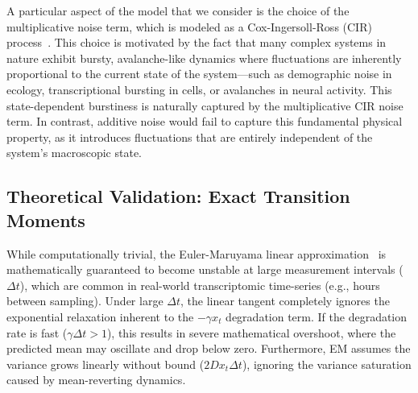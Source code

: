 \documentclass[10pt, aps, rmp,  twocolumn, superscriptaddress, floatfix, showkeys]{revtex4-2}
\begin{document}

A particular aspect of the model that we consider is the choice of the multiplicative noise term, which is modeled as a Cox-Ingersoll-Ross (CIR) process~\cite{cox1985theory}. This choice is motivated by the fact that many complex systems in nature exhibit bursty, avalanche-like dynamics where fluctuations are inherently proportional to the current state of the system---such as demographic noise in ecology, transcriptional bursting in cells, or avalanches in neural activity. This state-dependent burstiness is naturally captured by the multiplicative CIR noise term. In contrast, additive noise would fail to capture this fundamental physical property, as it introduces fluctuations that are entirely independent of the system's macroscopic state.






\subsection{Theoretical Validation: Exact Transition Moments}


While computationally trivial, the Euler-Maruyama linear approximation~\cite{kloeden1992numerical} is mathematically guaranteed to become unstable at large measurement intervals ($\Delta t$), which are common in real-world transcriptomic time-series (e.g., hours between sampling). Under large $\Delta t$, the linear tangent completely ignores the exponential relaxation inherent to the $-\gamma x_t$ degradation term. If the degradation rate is fast ($\gamma \Delta t > 1$), this results in severe mathematical overshoot, where the predicted mean may oscillate and drop below zero. Furthermore, EM assumes the variance grows linearly without bound ($2D x_t \Delta t$), ignoring the variance saturation caused by mean-reverting dynamics.
\end{document}
